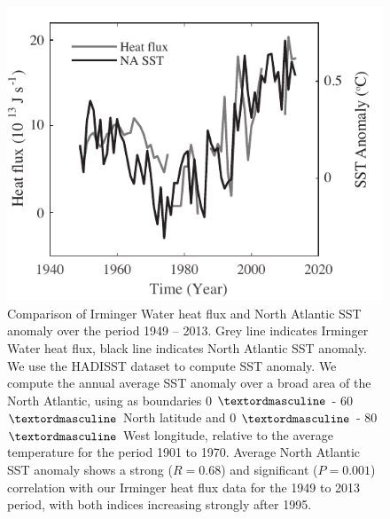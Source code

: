\begin{figure}
	\centering
	\includegraphics{figs_app/FigS2.pdf}
	\caption[Comparison of Irminger Water heat flux and North Atlantic SST anomaly over the period 1949 – 2013]{Comparison of Irminger Water heat flux and North Atlantic SST anomaly over the period 1949 – 2013.  Grey line indicates Irminger Water heat flux, black line indicates North Atlantic SST anomaly.  We use the HADISST dataset to compute SST anomaly.  We compute the annual average SST anomaly over a broad area of the North Atlantic, using as boundaries 0 $\textordmasculine$ - 60 $\textordmasculine$ North latitude and 0 $\textordmasculine$ - 80 $\textordmasculine$ West longitude, relative to the average temperature for the period 1901 to 1970.  Average North Atlantic SST anomaly shows a strong ($R=0.68$) and significant ($P=0.001$) correlation with our Irminger heat flux data for the 1949 to 2013 period, with both indices increasing strongly after 1995.}
	\label{fig:SI4_fig2}
\end{figure}


